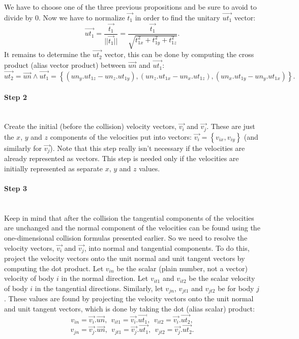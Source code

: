 We have to choose one of the three previous propositions and be sure to avoid to divide by 0.
Now we have to normalize $\vec{t_1}$ in order to find the unitary $\vec{ut_1}$ vector:
\begin{equation*}
	\vec{ut_1} = \frac{\vec{t_1}}{||\vec{t_1}||} = \frac{\vec{t_1}}{\sqrt{t_{1x}^2 + t_{1y}^2 + t_{1z}^2}}.
\end{equation*}
It remains to determine the $\vec{ut_2}$ vector, this can be done by computing the cross product (alias vector product) between $\vec{un}$ and $\vec{ut_1}$:
\begin{equation*}
	\vec{ut_2} = \vec{un} \wedge \vec{ut_1} = \left\{ (un_y . ut_{1z} - un_z . ut_{1y}), (un_z . ut_{1x} - un_x . ut_{1z}), (un_x . ut_{1y} - un_y . ut_{1x})\right\}.
\end{equation*}

\paragraph{Step 2}
~\\
Create the initial (before the collision) velocity vectors, $\vec{v_i}$ and $\vec{v_j}$. 
These are just the $x$, $y$ and $z$ components of the velocities put into vectors: $\vec{v_i} = \left\{ v_{ix}, v_{iy} \right\}$ (and similarly for $\vec{v_j}$). 
Note that this step really isn't necessary if the velocities are already represented as vectors. 
This step is needed only if the velocities are initially represented as separate $x$, $y$ and $z$ values.

\paragraph{Step 3}
~\\
Keep in mind that after the collision the tangential components of the velocities are unchanged and the normal component of the velocities can be found using the one-dimensional collision formulas presented earlier. 
So we need to resolve the velocity vectors, $\vec{v_i}$ and $\vec{v_j}$, into normal and tangential components. 
To do this, project the velocity vectors onto the unit normal and unit tangent vectors by computing the dot product. 
Let $v_{in}$ be the scalar (plain number, not a vector) velocity of body $i$ in the normal direction. 
Let $v_{it1}$ and $v_{it2}$ be the scalar velocity of body $i$ in the tangential directions. 
Similarly, let $v_{jn}$, $v_{jt1}$ and $v_{jt2}$ be for body $j$. 
These values are found by projecting the velocity vectors onto the unit normal and unit tangent vectors, which is done by taking the dot (alias scalar) product:
\begin{equation*}
	v_{in} = \vec{v_i}.\vec{un},~~v_{it1} = \vec{v_i}.\vec{ut_1},~~v_{it2} = \vec{v_i}.\vec{ut_2},
\end{equation*}
\begin{equation*}
	v_{jn} = \vec{v_j}.\vec{un},~~v_{jt1} = \vec{v_j}.\vec{ut_1},~~v_{jt2} = \vec{v_j}.\vec{ut_2}.
\end{equation*}

